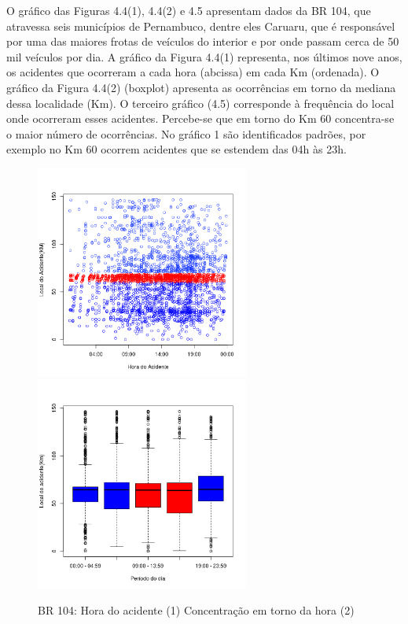 \pagebreak

O gráfico das Figuras 4.4(1), 4.4(2) e 4.5 apresentam dados da BR 104, que atravessa seis municípios de Pernambuco, dentre eles Caruaru, que é responsável por uma das maiores frotas de veículos do interior e por onde passam cerca de 50 mil veículos por dia. 
A gráfico da Figura 4.4(1) representa, nos últimos nove anos, os acidentes que ocorreram a cada hora (abcissa) em cada Km (ordenada).
O  gráfico da Figura 4.4(2) (boxplot) apresenta as ocorrências em torno da mediana dessa localidade (Km).
O terceiro gráfico (4.5) corresponde à frequência do local onde ocorreram esses acidentes. 
Percebe-se que em torno do Km 60 concentra-se o maior número de ocorrências. 
No gráfico 1 são identificados padrões, por exemplo no Km 60 ocorrem acidentes que se estendem das 04h às 23h. 



\begin{figure}[h]
	\caption{BR 104: Hora do acidente (1) Concentração em torno da hora (2)}
	\includegraphics[width=7cm,height=7cm]{Figuras/Preprocess/br104_12.png}
	\includegraphics[width=7cm,height=7cm]{Figuras/Preprocess/br104_2.png}

\end{figure}

